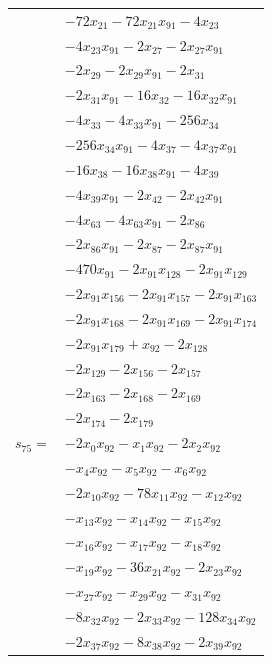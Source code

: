 \begin{longtable}{@{}r@{\;}l@{}}
 & \(\displaystyle -72x_{21} -72x_{21}x_{91} -4x_{23}\) \\
 & \(\displaystyle -4x_{23}x_{91} -2x_{27} -2x_{27}x_{91}\) \\
 & \(\displaystyle -2x_{29} -2x_{29}x_{91} -2x_{31}\) \\
 & \(\displaystyle -2x_{31}x_{91} -16x_{32} -16x_{32}x_{91}\) \\
 & \(\displaystyle -4x_{33} -4x_{33}x_{91} -256x_{34}\) \\
 & \(\displaystyle -256x_{34}x_{91} -4x_{37} -4x_{37}x_{91}\) \\
 & \(\displaystyle -16x_{38} -16x_{38}x_{91} -4x_{39}\) \\
 & \(\displaystyle -4x_{39}x_{91} -2x_{42} -2x_{42}x_{91}\) \\
 & \(\displaystyle -4x_{63} -4x_{63}x_{91} -2x_{86}\) \\
 & \(\displaystyle -2x_{86}x_{91} -2x_{87} -2x_{87}x_{91}\) \\
 & \(\displaystyle -470x_{91} -2x_{91}x_{128} -2x_{91}x_{129}\) \\
 & \(\displaystyle -2x_{91}x_{156} -2x_{91}x_{157} -2x_{91}x_{163}\) \\
 & \(\displaystyle -2x_{91}x_{168} -2x_{91}x_{169} -2x_{91}x_{174}\) \\
 & \(\displaystyle -2x_{91}x_{179} +x_{92} -2x_{128}\) \\
 & \(\displaystyle -2x_{129} -2x_{156} -2x_{157}\) \\
 & \(\displaystyle -2x_{163} -2x_{168} -2x_{169}\) \\
 & \(\displaystyle -2x_{174} -2x_{179}\) \\[3pt]
\(s_{75}=\) & \(\displaystyle -2x_{0}x_{92} -x_{1}x_{92} -2x_{2}x_{92}\) \\
 & \(\displaystyle -x_{4}x_{92} -x_{5}x_{92} -x_{6}x_{92}\) \\
 & \(\displaystyle -2x_{10}x_{92} -78x_{11}x_{92} -x_{12}x_{92}\) \\
 & \(\displaystyle -x_{13}x_{92} -x_{14}x_{92} -x_{15}x_{92}\) \\
 & \(\displaystyle -x_{16}x_{92} -x_{17}x_{92} -x_{18}x_{92}\) \\
 & \(\displaystyle -x_{19}x_{92} -36x_{21}x_{92} -2x_{23}x_{92}\) \\
 & \(\displaystyle -x_{27}x_{92} -x_{29}x_{92} -x_{31}x_{92}\) \\
 & \(\displaystyle -8x_{32}x_{92} -2x_{33}x_{92} -128x_{34}x_{92}\) \\
 & \(\displaystyle -2x_{37}x_{92} -8x_{38}x_{92} -2x_{39}x_{92}\) \\

\end{longtable}
